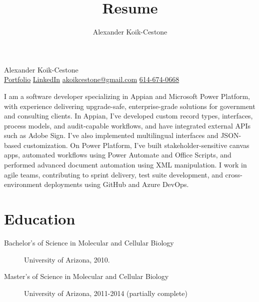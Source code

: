 \documentclass{article}
\author{Alexander Koik-Cestone}
\title{Resume}
\begin{document}
\begin{center}
{\huge Alexander Koik-Cestone\vspace{0.3cm}} \\
\href{https://sirkoik.github.io#portfolio}{Portfolio}
\textcolor{gray}{\textbullet}
\href{https://www.linkedin.com/in/alexander-koik-cestone-89304556/}{LinkedIn}
\textcolor{gray}{\textbullet}
\href{mailto:akoikcestone@gmail.com}{akoikcestone@gmail.com}
\textcolor{gray}{\textbullet}
\href{tel:614-674-0668}{614-674-0668} \\
\end{center}

\noindent
I am a software developer specializing in Appian and Microsoft Power Platform, with experience delivering upgrade-safe, enterprise-grade solutions for government and consulting clients. In Appian, I’ve developed custom record types, interfaces, process models, and audit-capable workflows, and have integrated external APIs such as Adobe Sign. I’ve also implemented multilingual interfaces and JSON-based customization. On Power Platform, I’ve built stakeholder-sensitive canvas apps, automated workflows using Power Automate and Office Scripts, and performed advanced document automation using XML manipulation. I work in agile teams, contributing to sprint delivery, test suite development, and cross-environment deployments using GitHub and Azure DevOps.

\section*{Education}\vspace{-0.5em}
\begin{description}
  \item[Bachelor's of Science in Molecular and Cellular Biology] University of Arizona, 2010.
  \item[Master's of Science in Molecular and Cellular Biology] University of Arizona, 2011-2014 (partially complete)
\end{description}

\vspace{-1em}
\end{document}

